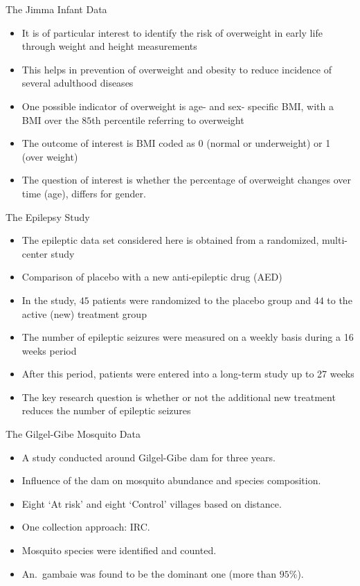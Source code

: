 \documentclass{beamer}
\begin{document}
\begin{frame}{The Jimma Infant Data}
\begin{itemize}
\item It is of particular interest to identify the risk of overweight in early life through weight and height measurements
\item This helps in  prevention of overweight and obesity to reduce incidence of several adulthood diseases
\item One possible indicator of overweight is age- and sex- specific BMI, with a BMI over the $85$th percentile referring to overweight
\item The outcome of interest is BMI coded as 0 (normal or underweight) or 1 (over weight)
\item The question of interest is whether the percentage of overweight changes over time (age),  differs for gender.
\end{itemize}
\end{frame}

\begin{frame}{The Epilepsy Study}
\begin{itemize}
\item The epileptic data set considered here is obtained from  a randomized, multi-center study
\item Comparison of placebo with  a new anti-epileptic drug (AED)	
\item In the study, $45$ patients were randomized to the placebo group and $44$ to the active (new) treatment group
\item The number of epileptic seizures were measured on a weekly basis during a 16 weeks period
\item After this period, patients were entered into a long-term  study up to 27 weeks
\item The key research question is whether or not the additional new treatment reduces the number of epileptic seizures	
\end{itemize}
\end{frame}

\begin{frame}{The Gilgel-Gibe Mosquito Data}
\begin{itemize}
\item A study conducted around Gilgel-Gibe dam for three years.
\item Influence of the dam on mosquito abundance and species composition.
\item Eight `At risk' and eight `Control' villages based on distance.
\item One collection approach: IRC.
\item Mosquito species were identified and counted.
\item An.~gambaie was found to be the dominant one (more than $95\%$).
\end{itemize}
\end{frame}
\end{document}
